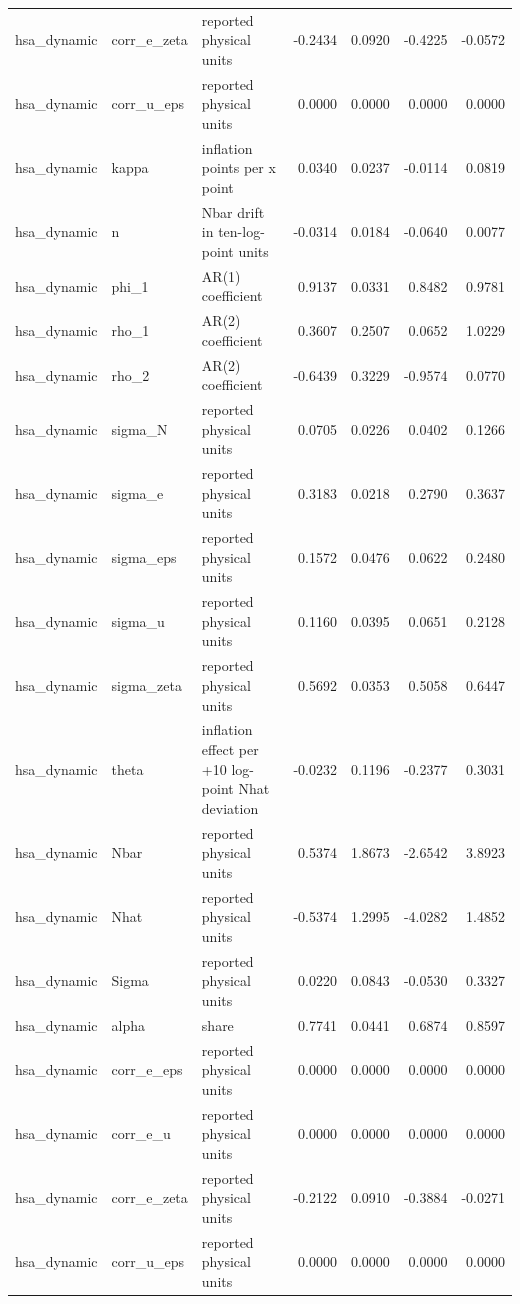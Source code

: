 \begin{tabular}{lllrrrr}
hsa\_dynamic & corr\_e\_zeta & reported physical units & -0.2434 & 0.0920 & -0.4225 & -0.0572 \\
hsa\_dynamic & corr\_u\_eps & reported physical units & 0.0000 & 0.0000 & 0.0000 & 0.0000 \\
hsa\_dynamic & kappa & inflation points per x point & 0.0340 & 0.0237 & -0.0114 & 0.0819 \\
hsa\_dynamic & n & Nbar drift in ten-log-point units & -0.0314 & 0.0184 & -0.0640 & 0.0077 \\
hsa\_dynamic & phi\_1 & AR(1) coefficient & 0.9137 & 0.0331 & 0.8482 & 0.9781 \\
hsa\_dynamic & rho\_1 & AR(2) coefficient & 0.3607 & 0.2507 & 0.0652 & 1.0229 \\
hsa\_dynamic & rho\_2 & AR(2) coefficient & -0.6439 & 0.3229 & -0.9574 & 0.0770 \\
hsa\_dynamic & sigma\_N & reported physical units & 0.0705 & 0.0226 & 0.0402 & 0.1266 \\
hsa\_dynamic & sigma\_e & reported physical units & 0.3183 & 0.0218 & 0.2790 & 0.3637 \\
hsa\_dynamic & sigma\_eps & reported physical units & 0.1572 & 0.0476 & 0.0622 & 0.2480 \\
hsa\_dynamic & sigma\_u & reported physical units & 0.1160 & 0.0395 & 0.0651 & 0.2128 \\
hsa\_dynamic & sigma\_zeta & reported physical units & 0.5692 & 0.0353 & 0.5058 & 0.6447 \\
hsa\_dynamic & theta & inflation effect per +10 log-point Nhat deviation & -0.0232 & 0.1196 & -0.2377 & 0.3031 \\
hsa\_dynamic & Nbar & reported physical units & 0.5374 & 1.8673 & -2.6542 & 3.8923 \\
hsa\_dynamic & Nhat & reported physical units & -0.5374 & 1.2995 & -4.0282 & 1.4852 \\
hsa\_dynamic & Sigma & reported physical units & 0.0220 & 0.0843 & -0.0530 & 0.3327 \\
hsa\_dynamic & alpha & share & 0.7741 & 0.0441 & 0.6874 & 0.8597 \\
hsa\_dynamic & corr\_e\_eps & reported physical units & 0.0000 & 0.0000 & 0.0000 & 0.0000 \\
hsa\_dynamic & corr\_e\_u & reported physical units & 0.0000 & 0.0000 & 0.0000 & 0.0000 \\
hsa\_dynamic & corr\_e\_zeta & reported physical units & -0.2122 & 0.0910 & -0.3884 & -0.0271 \\
hsa\_dynamic & corr\_u\_eps & reported physical units & 0.0000 & 0.0000 & 0.0000 & 0.0000 \\

\end{tabular}
